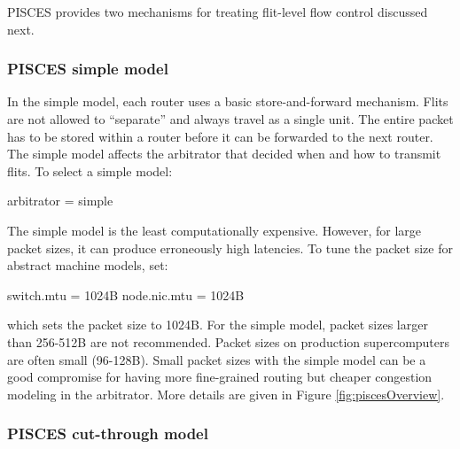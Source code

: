 PISCES provides two mechanisms for treating flit-level flow control discussed next.

\subsubsection{PISCES simple model}
\label{subsubsec:tutorial:simplePisces}
In the simple model, each router uses a basic store-and-forward mechanism.
Flits are not allowed to ``separate'' and always travel as a single unit.
The entire packet has to be stored within a router before it can be forwarded to the next router.
The simple model affects the arbitrator that decided when and how to transmit flits.
To select a simple model:

\begin{ViFile}
arbitrator = simple
\end{ViFile}
The simple model is the least computationally expensive. 
However, for large packet sizes, it can produce erroneously high latencies.
To tune the packet size for abstract machine models, set:

\begin{ViFile}
switch.mtu = 1024B
node.nic.mtu = 1024B
\end{ViFile}
which sets the packet size to 1024B. 
For the simple model, packet sizes larger than 256-512B are not recommended.
Packet sizes on production supercomputers are often small (96-128B).
Small packet sizes with the simple model can be a good compromise for having more fine-grained routing but cheaper congestion modeling in the arbitrator.
More details are given in Figure \ref{fig:piscesOverview}.

\subsubsection{PISCES cut-through model}
\label{subsubsec:tutorial:cutThroughPisces}

